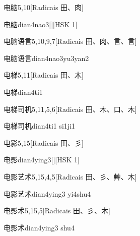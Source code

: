 \begin{entry}{电脑}{5,10}[Radicais ⽥、⾁]
  \begin{phonetics}{电脑}{dian4nao3}[][HSK 1]
  \end{phonetics}
\end{entry}

\begin{entry}{电脑语言}{5,10,9,7}[Radicais ⽥、⾁、⾔、⾔]
  \begin{phonetics}{电脑语言}{dian4nao3yu3yan2}
  \end{phonetics}
\end{entry}

\begin{entry}{电梯}{5,11}[Radicais ⽥、⽊]
  \begin{phonetics}{电梯}{dian4ti1}
  \end{phonetics}
\end{entry}

\begin{entry}{电梯司机}{5,11,5,6}[Radicais ⽥、⽊、⼝、⽊]
  \begin{phonetics}{电梯司机}{dian4ti1 si1ji1}
  \end{phonetics}
\end{entry}

\begin{entry}{电影}{5,15}[Radicais ⽥、⼺]
  \begin{phonetics}{电影}{dian4ying3}[][HSK 1]
  \end{phonetics}
\end{entry}

\begin{entry}{电影艺术}{5,15,4,5}[Radicais ⽥、⼺、⾋、⽊]
  \begin{phonetics}{电影艺术}{dian4ying3 yi4shu4}
  \end{phonetics}
\end{entry}

\begin{entry}{电影术}{5,15,5}[Radicais ⽥、⼺、⽊]
  \begin{phonetics}{电影术}{dian4ying3 shu4}
  \end{phonetics}
\end{entry}

